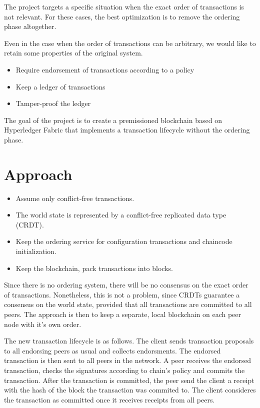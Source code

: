 The project targets a specific situation when the exact order of transactions is not relevant. For these cases, the best optimization is to remove the ordering phase altogether.

Even in the case when the order of transactions can be arbitrary, we would like to retain some properties of the original system.

\begin{itemize}
  \item Require endorsement of transactions according to a policy
  \item Keep a ledger of transactions
  \item Tamper-proof the ledger
\end{itemize}

The goal of the project is to create a premissioned blockchain based on Hyperledger Fabric that implements a transaction lifecycle without the ordering phase.

\section{Approach}
 \label{sec:approach}

\begin{itemize}
  \item Assume only conflict-free transactions.
  \item The world state is represented by a conflict-free replicated data type (CRDT).
  \item Keep the ordering service for configuration transactions and chaincode initialization.
  \item Keep the blockchain, pack transactions into blocks.
\end{itemize}

 Since there is no ordering system, there will be no consensus on the exact order of transactions. Nonetheless, this is not a problem, since CRDTs guarantee a consensus on the world state, provided that all transactions are committed to all peers. The approach is then to keep a separate, local blockchain on each peer node with it's own order.

 The new transaction lifecycle is as follows.
 The client sends transaction proposals to all endorsing peers as usual and collects endorsments. The endorsed transaction is then sent to all peers in the network. A peer receives the endorsed transaction, checks the signatures according to chain's policy and commits the transaction. After the transaction is committed, the peer send the client a receipt with the hash of the block the transaction was commited to. The client consideres the transaction as committed once it receives receipts from all peers.

